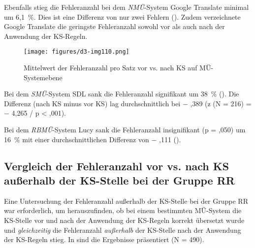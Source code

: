 Ebenfalls stieg die Fehleranzahl bei dem \textit{NMÜ}{}-System Google Translate minimal um 6,1~\%. Dies ist eine Differenz von nur zwei Fehlern (). Zudem verzeichnete Google Translate die geringste Fehleranzahl sowohl vor als auch nach der Anwendung der KS-Regeln.


\begin{figure}
\texttt{[image: figures/d3-img110.png]}\\


\caption{\label{fig:05:138}Mittelwert der Fehleranzahl pro Satz vor vs. nach KS auf MÜ-Systemebene   }
\end{figure}

Bei dem \textit{SMÜ}{}-System SDL sank die Fehleranzahl signifikant um 38~\% (). Die Differenz (nach KS minus vor KS) lag durchschnittlich bei $-$ ,389 (z (N = 216) = $-$ 4,265 / p < ,001).

Bei dem \textit{RBMÜ}{}-System Lucy sank die Fehleranzahl insignifikant (p = ,050) um 16~\% mit einer durchschnittlichen Differenz von $-$ ,111 ().


\subsection{Vergleich der Fehleranzahl vor vs. nach KS außerhalb der KS-Stelle bei der Gruppe RR}
\label{sec:5.4.2}

Eine Untersuchung der Fehleranzahl außerhalb der KS-Stelle bei der Gruppe RR war erforderlich, um herauszufinden, ob bei einem bestimmten MÜ-System die KS-Stelle vor und nach der Anwendung der KS-Regeln korrekt übersetzt wurde und \textit{gleichzeitig} die Fehleranzahl \textit{außerhalb} der KS-Stelle nach der Anwendung der KS-Regeln stieg. %
In  sind die Ergebnisse präsentiert (N = 490).


